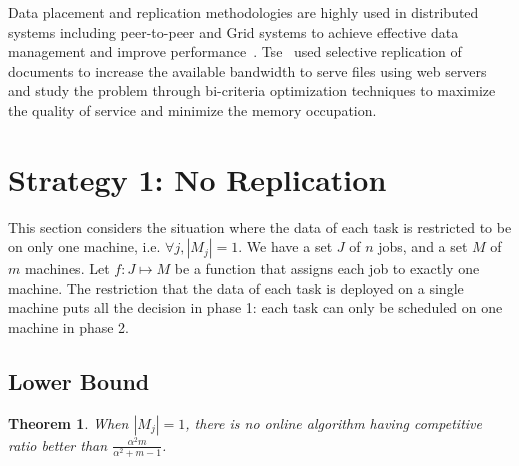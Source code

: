 \documentclass[10pt, conference, compsocconf]{IEEEtran}
\newtheorem{theorem}{Theorem}
\begin{document}
Data placement and replication methodologies are highly used in
distributed systems including peer-to-peer and Grid systems to achieve
effective data management and improve
performance~\cite{Cirne2007213}\cite{Abawajy}\cite{4215379}. Tse~\cite{DBLP:journals/tc/Tse12}
used selective replication of documents to increase the available
bandwidth to serve files using web servers and study the problem
through bi-criteria optimization techniques to maximize the quality of
service and minimize the memory occupation.

\section{Strategy 1: No Replication}\label{sec4}


This section considers the situation where the data of each task is
restricted to be on only one machine, i.e. $\forall j, |M_j|=1$.  We
have a set $J$ of $ n$ jobs, and a set $M$ of $m$ machines.  Let $f :
J \mapsto M$ be a function that assigns each job to exactly one
machine. The restriction that the data of each task is deployed on a
single machine puts all the decision in phase 1: each task can only be
scheduled on one machine in phase 2.

\subsection{Lower Bound}


\begin{theorem}
\label{th:model1-lb}
  When $|M_j| = 1$, there is no online algorithm having competitive
  ratio better than $\frac{\alpha^{2}m }{\alpha^{2} + m-1}$.
\end{theorem}
 
\end{document}
